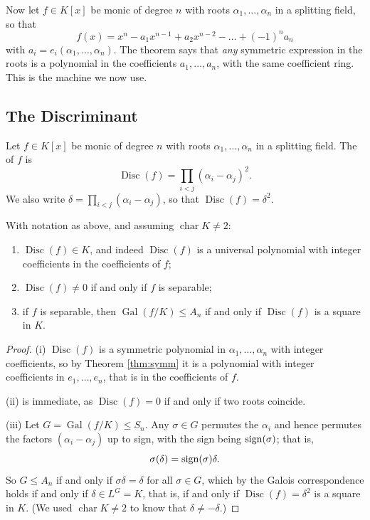 \documentclass[a4paper]{scrartcl}
\newcommand{\charr}{\operatorname{char}}
\newcommand{\Gal}{\operatorname{Gal}}
\newcommand{\Disc}{\operatorname{Disc}}
\begin{document}
Now let $f \in K[x]$ be monic of degree $n$ with roots $\alpha_1, \dots, \alpha_n$ in a splitting field, so that
$$f(x) = x^n - a_1x^{n-1} + a_2x^{n-2} - \dots + (-1)^n a_n$$
with $a_i = e_i(\alpha_1,\dots,\alpha_n)$. The theorem says that \emph{any} symmetric expression in the roots is a polynomial in the coefficients $a_1,\dots,a_n$, with the same coefficient ring. This is the machine we now use.

\subsection{The Discriminant}

\begin{definition}[Discriminant]
	Let $f \in K[x]$ be monic of degree $n$ with roots $\alpha_1,\dots,\alpha_n$ in a splitting field. The  of $f$ is
	$$\Disc(f) = \prod_{i<j}(\alpha_i - \alpha_j)^2.$$
	We also write $\delta = \prod_{i<j}(\alpha_i - \alpha_j)$, so that $\Disc(f) = \delta^2$.
\end{definition}

\begin{proposition}\label{prop:disc}
	With notation as above, and assuming $\charr K \neq 2$:
	\begin{enumerate}[label=(\roman*)]
		\item $\Disc(f) \in K$, and indeed $\Disc(f)$ is a universal polynomial with integer coefficients in the coefficients of $f$;
		\item $\Disc(f) \neq 0$ if and only if $f$ is separable;
		\item if $f$ is separable, then $\Gal(f/K) \leq A_n$ if and only if $\Disc(f)$ is a square in $K$.
	\end{enumerate}
\end{proposition}

\begin{proof}
	(i) $\Disc(f)$ is a symmetric polynomial in $\alpha_1, \dots, \alpha_n$ with integer coefficients, so by Theorem \ref{thm:symm} it is a polynomial with integer coefficients in $e_1, \dots, e_n$, that is in the coefficients of $f$.

	(ii) is immediate, as $\Disc(f) = 0$ if and only if two roots coincide.

	(iii) Let $G = \Gal(f/K) \leq S_n$. Any $\sigma \in G$ permutes the $\alpha_i$ and hence permutes the factors $(\alpha_i - \alpha_j)$ up to sign, with the sign being $\operatorname{sign}(\sigma)$; that is,
	$$\sigma(\delta) = \operatorname{sign}(\sigma)\delta.$$
	So $G \leq A_n$ if and only if $\sigma\delta = \delta$ for all $\sigma \in G$, which by the Galois correspondence holds if and only if $\delta \in L^G = K$, that is, if and only if $\Disc(f) = \delta^2$ is a square in $K$. (We used $\charr K \neq 2$ to know that $\delta \neq -\delta$.)
\end{proof}
\end{document}
